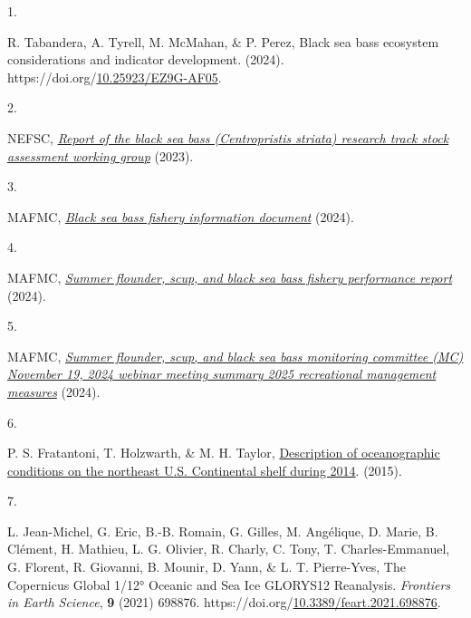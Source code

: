 \documentclass[
  10pt,
  letterpaper,
  DIV=11,
  numbers=noendperiod]{scrartcl}
\newlength{\cslhangindent}
\newlength{\csllabelwidth}
\newenvironment{CSLReferences}[2] %
 {\begin{list}{}{%
  \setlength{\itemindent}{0pt}
  \setlength{\leftmargin}{0pt}
  \setlength{\parsep}{0pt}
  \ifodd #1
   \setlength{\leftmargin}{\cslhangindent}
   \setlength{\itemindent}{-1\cslhangindent}
  \fi
  \setlength{\itemsep}{#2\baselineskip}}}
 {\end{list}}
\newcommand{\CSLLeftMargin}[1]{\parbox[t]{\csllabelwidth}{\strut#1\strut}}
\newcommand{\CSLRightInline}[1]{\parbox[t]{\linewidth - \csllabelwidth}{\strut#1\strut}}
\begin{document}
\label{refs}
\begin{CSLReferences}{0}{0}
\CSLLeftMargin{1. }%
\CSLRightInline{R. Tabandera, A. Tyrell, M. McMahan, \& P. Perez, Black
sea bass ecosystem considerations and indicator development. (2024).
https://doi.org/\href{https://doi.org/10.25923/EZ9G-AF05}{10.25923/EZ9G-AF05}.}

\CSLLeftMargin{2. }%
\CSLRightInline{NEFSC,
\emph{\href{https://d23h0vhsm26o6d.cloudfront.net/11a.-2023_BSB_UNIT_RTWG_Report_V2_12_2_2023.pdf}{Report
of the black sea bass (\emph{{Centropristis} striata}) research track
stock assessment working group}} (2023).}

\CSLLeftMargin{3. }%
\CSLRightInline{MAFMC,
\emph{\href{https://static1.squarespace.com/static/511cdc7fe4b00307a2628ac6/t/6683032fa306b9070227348b/1719862063436/2024_BSB-fishery-info-doc.pdf}{Black
sea bass fishery information document}} (2024).}

\CSLLeftMargin{4. }%
\CSLRightInline{MAFMC,
\emph{\href{https://static1.squarespace.com/static/511cdc7fe4b00307a2628ac6/t/6697d5dde4c39b20168045b7/1721226717179/b_SFSBSB-FPR-Jul-2024.pdf}{Summer
flounder, scup, and black sea bass fishery performance report}} (2024).}

\CSLLeftMargin{5. }%
\CSLRightInline{MAFMC,
\emph{\href{https://static1.squarespace.com/static/511cdc7fe4b00307a2628ac6/t/674755f846e791454569703f/1732728312681/01_2025+SF+Rec+Measures.pdf}{Summer
flounder, scup, and black sea bass monitoring committee ({MC})
{November} 19, 2024 webinar meeting summary 2025 recreational management
measures}} (2024).}

\CSLLeftMargin{6. }%
\CSLRightInline{P. S. Fratantoni, T. Holzwarth, \& M. H. Taylor,
\href{https://repository.library.noaa.gov/view/noaa/5047}{Description of
oceanographic conditions on the northeast {U}.{S}. Continental shelf
during 2014}. (2015).}

\CSLLeftMargin{7. }%
\CSLRightInline{L. Jean-Michel, G. Eric, B.-B. Romain, G. Gilles, M.
Angélique, D. Marie, B. Clément, H. Mathieu, L. G. Olivier, R. Charly,
C. Tony, T. Charles-Emmanuel, G. Florent, R. Giovanni, B. Mounir, D.
Yann, \& L. T. Pierre-Yves, The {Copernicus} {Global} 1/12° {Oceanic}
and {Sea} {Ice} {GLORYS12} {Reanalysis}. \emph{Frontiers in Earth
Science}, \textbf{9} (2021) 698876.
https://doi.org/\href{https://doi.org/10.3389/feart.2021.698876}{10.3389/feart.2021.698876}.}

\end{CSLReferences}
\end{document}

